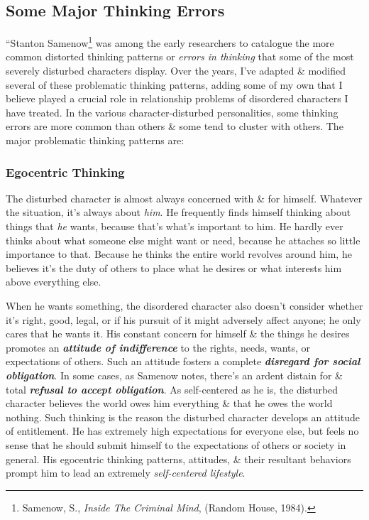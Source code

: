 \documentclass{article}
\numberwithin{equation}{section}
\begin{document}
\subsection{Some Major Thinking Errors}
``Stanton Samenow\footnote{Samenow, S., {\it Inside The Criminal Mind}, (Random House, 1984).} was among the early researchers to catalogue the more common distorted thinking patterns or \textit{errors in thinking} that some of the most severely disturbed characters display. Over the years, I've adapted \& modified several of these problematic thinking patterns, adding some of my own that I believe played a crucial role in relationship problems of disordered characters I have treated. In the various character-disturbed personalities, some thinking errors are more common than others \& some tend to cluster with others. The major problematic thinking patterns are:

\subsubsection{Egocentric Thinking}
The disturbed character is almost always concerned with \& for himself. Whatever the situation, it's always about \textit{him}. He frequently finds himself thinking about things that \textit{he} wants, because that's what's important to him. He hardly ever thinks about what someone else might want or need, because he attaches so little importance to that. Because he thinks the entire world revolves around him, he believes it's the duty of others to place what he desires or what interests him above everything else.

When he wants something, the disordered character also doesn't consider whether it's right, good, legal, or if his pursuit of it might adversely affect anyone; he only cares that he wants it. His constant concern for himself \& the things he desires promotes an \textbf{\textit{attitude of indifference}} to the rights, needs, wants, or expectations of others. Such an attitude fosters a complete \textbf{\textit{disregard for social obligation}}. In some cases, as Samenow notes, there's an ardent distain for \& total \textbf{\textit{refusal to accept obligation}}. As self-centered as he is, the disturbed character believes the world owes him everything \& that he owes the world nothing. Such thinking is the reason the disturbed character develops an attitude of entitlement. He has extremely high expectations for everyone else, but feels no sense that he should submit himself to the expectations of others or society in general. His egocentric thinking patterns, attitudes, \& their resultant behaviors prompt him to lead an extremely \textit{self-centered lifestyle}.
\end{document}
